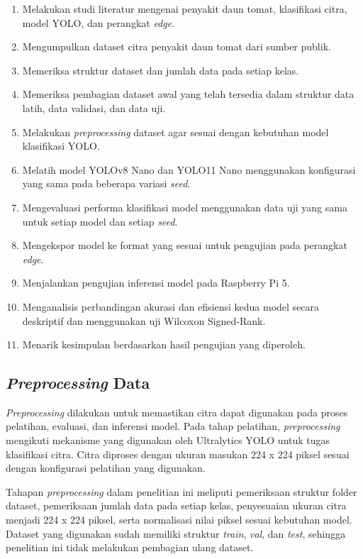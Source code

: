 \begin{sectioncontent}
\begin{subsectioncontent}
    \begin{enumerate}[leftmargin=0.75cm,label=\arabic*.]
        \item Melakukan studi literatur mengenai penyakit daun tomat, klasifikasi citra, model YOLO, dan perangkat \textit{edge}.
        \item Mengumpulkan dataset citra penyakit daun tomat dari sumber publik.
        \item Memeriksa struktur dataset dan jumlah data pada setiap kelas.
        \item Memeriksa pembagian dataset awal yang telah tersedia dalam struktur data latih, data validasi, dan data uji.
        \item Melakukan \textit{preprocessing} dataset agar sesuai dengan kebutuhan model klasifikasi YOLO.
        \item Melatih model YOLOv8 Nano dan YOLO11 Nano menggunakan konfigurasi yang sama pada beberapa variasi \textit{seed}.
        \item Mengevaluasi performa klasifikasi model menggunakan data uji yang sama untuk setiap model dan setiap \textit{seed}.
        \item Mengekspor model ke format yang sesuai untuk pengujian pada perangkat \textit{edge}.
        \item Menjalankan pengujian inferensi model pada Raspberry Pi 5.
        \item Menganalisis perbandingan akurasi dan efisiensi kedua model secara deskriptif dan menggunakan uji Wilcoxon Signed-Rank.
        \item Menarik kesimpulan berdasarkan hasil pengujian yang diperoleh.
    \end{enumerate}
\end{subsectioncontent}

\subsection{\textit{Preprocessing} Data}
\begin{subsectioncontent}
    \hspace{\parindent}\textit{Preprocessing} dilakukan untuk memastikan citra dapat digunakan pada proses pelatihan, evaluasi, dan inferensi model. Pada tahap pelatihan, \textit{preprocessing} mengikuti mekanisme yang digunakan oleh Ultralytics YOLO untuk tugas klasifikasi citra. Citra diproses dengan ukuran masukan 224 x 224 piksel sesuai dengan konfigurasi pelatihan yang digunakan.

    Tahapan \textit{preprocessing} dalam penelitian ini meliputi pemeriksaan struktur folder dataset, pemeriksaan jumlah data pada setiap kelas, penyesuaian ukuran citra menjadi 224 x 224 piksel, serta normalisasi nilai piksel sesuai kebutuhan model. Dataset yang digunakan sudah memiliki struktur \textit{train}, \textit{val}, dan \textit{test}, sehingga penelitian ini tidak melakukan pembagian ulang dataset.


\end{subsectioncontent}
\end{sectioncontent}

